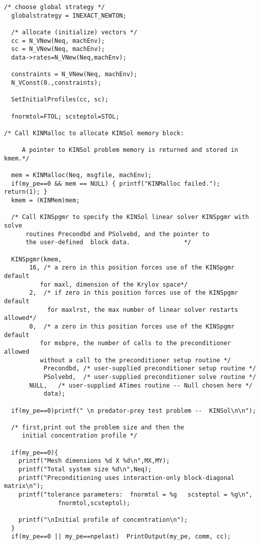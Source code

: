 \documentclass[11pt]{article}
\begin{document}
\begin{verbatim}
/* choose global strategy */
  globalstrategy = INEXACT_NEWTON;

  /* allocate (initialize) vectors */
  cc = N_VNew(Neq, machEnv);
  sc = N_VNew(Neq, machEnv);
  data->rates=N_VNew(Neq,machEnv);

  constraints = N_VNew(Neq, machEnv);
  N_VConst(0.,constraints);
  
  SetInitialProfiles(cc, sc);

  fnormtol=FTOL; scsteptol=STOL;

/* Call KINMalloc to allocate KINSol memory block: 

     A pointer to KINSol problem memory is returned and stored in kmem.*/

  mem = KINMalloc(Neq, msgfile, machEnv);
  if(my_pe==0 && mem == NULL) { printf("KINMalloc failed."); return(1); }
  kmem = (KINMem)mem;

  /* Call KINSpgmr to specify the KINSol linear solver KINSpgmr with solve 
      routines Precondbd and PSolvebd, and the pointer to 
      the user-defined  block data.               */

  KINSpgmr(kmem,
       16, /* a zero in this position forces use of the KINSpgmr default
          for maxl, dimension of the Krylov space*/
       2,  /* if zero in this position forces use of the KINSpgmr default
            for maxlrst, the max number of linear solver restarts allowed*/
       0,  /* a zero in this position forces use of the KINSpgmr default 
          for msbpre, the number of calls to the preconditioner allowed
          without a call to the preconditioner setup routine */
           Precondbd, /* user-supplied preconditioner setup routine */
           PSolvebd,  /* user-supplied preconditioner solve routine */
       NULL,   /* user-supplied ATimes routine -- Null chosen here */
           data);

  if(my_pe==0)printf(" \n predator-prey test problem --  KINSol\n\n");

  /* first,print out the problem size and then the 
     initial concentration profile */

  if(my_pe==0){
    printf("Mesh dimensions %d X %d\n",MX,MY);
    printf("Total system size %d\n",Neq);
    printf("Preconditioning uses interaction-only block-diagonal matrix\n");
    printf("tolerance parameters:  fnormtol = %g   scsteptol = %g\n",
               fnormtol,scsteptol);

    printf("\nInitial profile of concentration\n");
  }
  if(my_pe==0 || my_pe==npelast)  PrintOutput(my_pe, comm, cc);
  

\end{verbatim}
\end{document}
